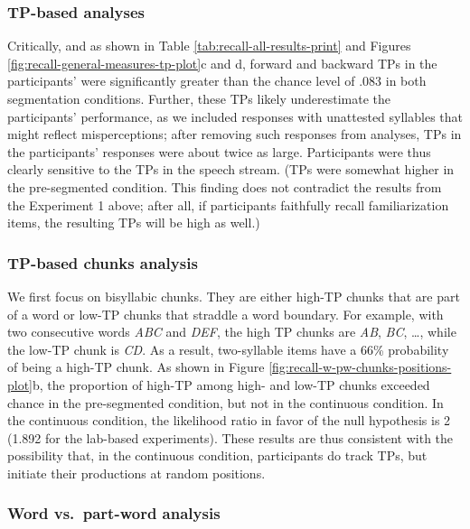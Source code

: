 \documentclass[
]{article}
\begin{document}
\subsubsection{TP-based analyses}\label{tp-based-analyses}

Critically, and as shown in Table \ref{tab:recall-all-results-print} and
Figures \ref{fig:recall-general-measures-tp-plot}c and d, forward and
backward TPs in the participants' were significantly greater than the
chance level of \(.083\) in both segmentation conditions. Further, these
TPs likely underestimate the participants' performance, as we included
responses with unattested syllables that might reflect misperceptions;
after removing such responses from analyses, TPs in the participants'
responses were about twice as large. Participants were thus clearly
sensitive to the TPs in the speech stream. (TPs were somewhat higher in
the pre-segmented condition. This finding does not contradict the
results from the Experiment 1 above; after all, if participants
faithfully recall familiarization items, the resulting TPs will be high
as well.)

\subsubsection{TP-based chunks analysis}\label{tp-based-chunks-analysis}

We first focus on bisyllabic chunks. They are either high-TP chunks that
are part of a word or low-TP chunks that straddle a word boundary. For
example, with two consecutive words \emph{ABC} and \emph{DEF}, the high
TP chunks are \emph{AB}, \emph{BC}, \ldots, while the low-TP chunk is
\emph{CD}. As a result, two-syllable items have a 66\% probability of
being a high-TP chunk. As shown in Figure
\ref{fig:recall-w-pw-chunks-positions-plot}b, the proportion of high-TP
among high- and low-TP chunks exceeded chance in the pre-segmented
condition, but not in the continuous condition. In the continuous
condition, the likelihood ratio in favor of the null hypothesis is 2
(1.892 for the lab-based experiments). These results are thus consistent
with the possibility that, in the continuous condition, participants do
track TPs, but initiate their productions at random positions.

\subsubsection{Word vs.~part-word
analysis}\label{word-vs.-part-word-analysis}
\end{document}
